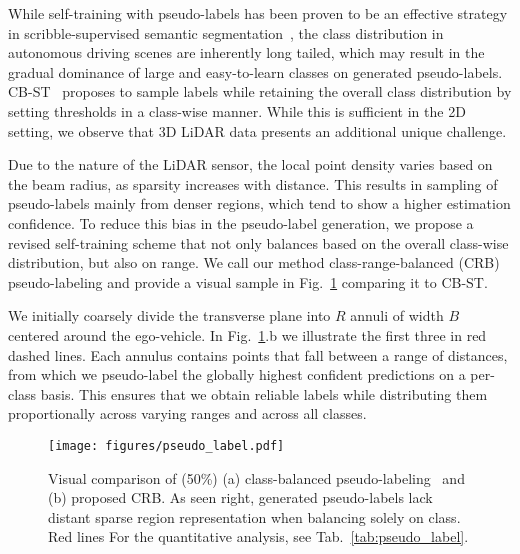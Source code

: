 \documentclass[10pt,twocolumn,letterpaper]{article}
\begin{document}
While self-training with pseudo-labels has been proven to be an effective strategy in scribble-supervised semantic segmentation~\cite{cvpr2016scribblesup, tvcg2020scribble3d}, the class distribution in autonomous driving scenes are inherently long tailed, which may result in the gradual dominance of large and easy-to-learn classes on generated pseudo-labels. CB-ST~\cite{eccv2018classbalanced} proposes to sample labels while retaining the overall class distribution by setting thresholds in a class-wise manner. While this is sufficient in the 2D setting, we observe that 3D LiDAR data presents an additional unique challenge.

Due to the nature of the LiDAR sensor, the local point density varies based on the beam radius, as sparsity increases with distance. This results in sampling of pseudo-labels mainly from denser regions, which tend to show a higher estimation confidence. To reduce this bias in the pseudo-label generation, we propose a revised self-training scheme that not only balances based on the overall class-wise distribution, but also on range. We call our method class-range-balanced (CRB) pseudo-labeling and provide a visual sample in Fig.~\ref{fig:pseudo_label} comparing it to CB-ST.

We initially coarsely divide the transverse plane into $R$ annuli of width $B$ centered around the ego-vehicle. In Fig.~\ref{fig:pseudo_label}.b we illustrate the first three in red dashed lines. Each annulus contains points that fall between a range of distances, from which we pseudo-label the globally highest confident predictions on a per-class basis. This ensures that we obtain reliable labels while distributing them proportionally across varying ranges and across all classes.

\begin{figure}[t]
    \centering
    \texttt{[image: figures/pseudo\_label.pdf]}
    \caption{Visual comparison of (50\%) (a) class-balanced pseudo-labeling~\cite{eccv2018classbalanced} and (b) proposed CRB. As seen right, generated pseudo-labels lack distant sparse region representation when balancing solely on class. Red lines For the quantitative analysis, see Tab.~\ref{tab:pseudo_label}.
    \label{fig:pseudo_label}}
\end{figure}
\end{document}
